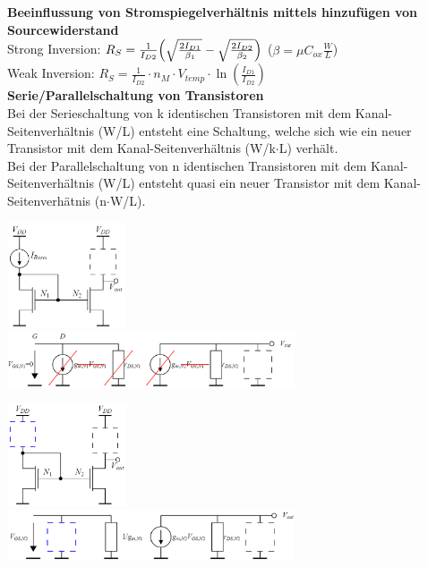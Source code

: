 \textbf{Beeinflussung von Stromspiegelverhältnis mittels hinzufügen von Sourcewiderstand} \\
Strong Inversion: $R_S=\frac{1}{I_{D2}} \Bigl(\sqrt{\frac{2I_{D1}}{\beta_1}} - \sqrt{\frac{2I_{D2}}{\beta_2}}\Bigr)$ \hspace{20pt}($\beta = \mu C_{ox} \frac{W}{L}$)\\
Weak Inversion: $R_S = \frac{1}{I_{D2}}\cdot n_M\cdot V_{temp} \cdot \ln(\frac{I_{D1}}{I_{D2}})$\\
\textbf{Serie/Parallelschaltung von Transistoren} \\
Bei der Serieschaltung von k identischen Transistoren mit dem Kanal-Seitenverhältnis (W/L) entsteht eine Schaltung, welche sich wie ein neuer Transistor mit dem Kanal-Seitenverhältnis (W/k$\cdot$L) verhält. \\
Bei der Parallelschaltung von n identischen Transistoren mit dem Kanal-Seitenverhältnis (W/L) entsteht quasi ein neuer Transistor mit dem Kanal-Seitenverhätnis (n$\cdot$W/L).\\
\begin{minipage}{0.5\linewidth}
    \includegraphics[width=3.5cm]{Stromspiegel_mitStromquelle_GS.png}\\\includegraphics[width=8.5cm]{Stromspiegel_mitStromquelle_KS.png}
\end{minipage}%
\begin{minipage}{0.5\linewidth}
    \includegraphics[width=3.5cm]{Stromspiegel_ohneStromquelle_GS.png}\\\includegraphics[width=8.5cm]{Stromspiegel_ohneStromquelle_KS.png}
\end{minipage}
\newpage
